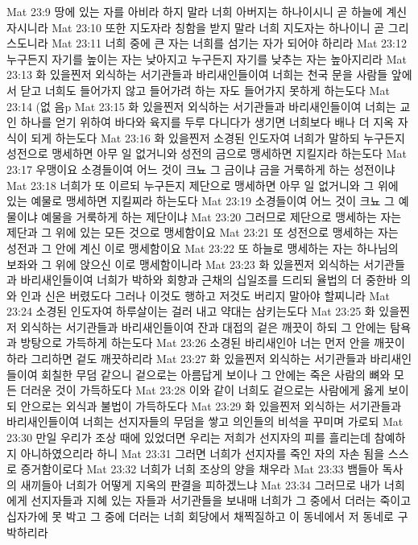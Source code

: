 Mat 23:9  땅에 있는 자를 아비라 하지 말라 너희 아버지는 하나이시니 곧 하늘에 계신 자시니라
Mat 23:10  또한 지도자라 칭함을 받지 말라 너희 지도자는 하나이니 곧 그리스도니라
Mat 23:11  너희 중에 큰 자는 너희를 섬기는 자가 되어야 하리라
Mat 23:12  누구든지 자기를 높이는 자는 낮아지고 누구든지 자기를 낮추는 자는 높아지리라
Mat 23:13  화 있을찐저 외식하는 서기관들과 바리새인들이여 너희는 천국 문을 사람들 앞에서 닫고 너희도 들어가지 않고 들어가려 하는 자도 들어가지 못하게 하는도다
Mat 23:14  (없 음p
Mat 23:15  화 있을찐저 외식하는 서기관들과 바리새인들이여 너희는 교인 하나를 얻기 위하여 바다와 육지를 두루 다니다가 생기면 너희보다 배나 더 지옥 자식이 되게 하는도다
Mat 23:16  화 있을찐저 소경된 인도자여 너희가 말하되 누구든지 성전으로 맹세하면 아무 일 없거니와 성전의 금으로 맹세하면 지킬지라 하는도다
Mat 23:17  우맹이요 소경들이여 어느 것이 크뇨 그 금이냐 금을 거룩하게 하는 성전이냐
Mat 23:18  너희가 또 이르되 누구든지 제단으로 맹세하면 아무 일 없거니와 그 위에 있는 예물로 맹세하면 지킬찌라 하는도다
Mat 23:19  소경들이여 어느 것이 크뇨 그 예물이냐 예물을 거룩하게 하는 제단이냐
Mat 23:20  그러므로 제단으로 맹세하는 자는 제단과 그 위에 있는 모든 것으로 맹세함이요
Mat 23:21  또 성전으로 맹세하는 자는 성전과 그 안에 계신 이로 맹세함이요
Mat 23:22  또 하늘로 맹세하는 자는 하나님의 보좌와 그 위에 앉으신 이로 맹세함이니라
Mat 23:23  화 있을찐저 외식하는 서기관들과 바리새인들이여 너희가 박하와 회향과 근채의 십일조를 드리되 율법의 더 중한바 의와 인과 신은 버렸도다 그러나 이것도 행하고 저것도 버리지 말아야 할찌니라
Mat 23:24  소경된 인도자여 하루살이는 걸러 내고 약대는 삼키는도다
Mat 23:25  화 있을찐저 외식하는 서기관들과 바리새인들이여 잔과 대접의 겉은 깨끗이 하되 그 안에는 탐욕과 방탕으로 가득하게 하는도다
Mat 23:26  소경된 바리새인아 너는 먼저 안을 깨끗이 하라 그리하면 겉도 깨끗하리라
Mat 23:27  화 있을찐저 외식하는 서기관들과 바리새인들이여 회칠한 무덤 같으니 겉으로는 아름답게 보이나 그 안에는 죽은 사람의 뼈와 모든 더러운 것이 가득하도다
Mat 23:28  이와 같이 너희도 겉으로는 사람에게 옳게 보이되 안으로는 외식과 불법이 가득하도다
Mat 23:29  화 있을찐저 외식하는 서기관들과 바리새인들이여 너희는 선지자들의 무덤을 쌓고 의인들의 비석을 꾸미며 가로되
Mat 23:30  만일 우리가 조상 때에 있었더면 우리는 저희가 선지자의 피를 흘리는데 참예하지 아니하였으리라 하니
Mat 23:31  그러면 너희가 선지자를 죽인 자의 자손 됨을 스스로 증거함이로다
Mat 23:32  너희가 너희 조상의 양을 채우라
Mat 23:33  뱀들아 독사의 새끼들아 너희가 어떻게 지옥의 판결을 피하겠느냐
Mat 23:34  그러므로 내가 너희에게 선지자들과 지혜 있는 자들과 서기관들을 보내매 너희가 그 중에서 더러는 죽이고 십자가에 못 박고 그 중에 더러는 너희 회당에서 채찍질하고 이 동네에서 저 동네로 구박하리라
